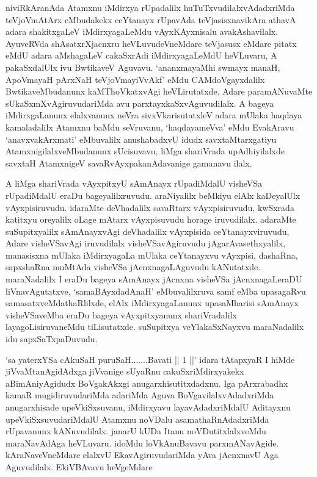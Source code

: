 \begin{artha}
niviRkAranAda Atamxnu iMdirxya rUpadalilx huTuTxvudilalxvAdadxriMda teVjoVmAtArx eMbudakekx ceYtanayx rUpavAda teVjasisxnavikAra athavA adara shakitxgaLeV iMdirxyagaLeMdu vAyxKAyxnisalu avakAshavilalx. AyuveRVda shAsatxrXjacnxru heVLuvudeVneMdare teVjasusx eMdare pitatx eMdU adara aMshagaLeV cakaSxrAdi iMdirxyagaLeMdU heVLuvaru, A pakaSxdalUlx ivu BwtikaveV Aguvavu. `ananxmayaMhi swmayx manaH, ApoVmayaH pArxNaH teVjoVmayiVvAkf' eMdu CAMdoVgayxdalilx BwtikaveMbudanunx kaMThoVkatxvAgi heVLirutatxde. Adare paramANuvaMte sUkaSxmXvAgiruvudariMda avu parxtayxkaSxvAguvudilalx. A bageya iMdirxgaLanunx elalxvanunx neVra sivxVkarisutatxleV adara mUlaka haqdaya kamaladalilx Atamxnu baMdu seVruvanu, `haqdayameVva' eMdu EvakAravu `anavxvakArxmati' eMbuvalilx anushabadxvU idudx savxtaMtarxgatiyu AtamxnigilalxveMbudanunx sUcisuvavu, liMga shariVrada upAdhiyilalxde savxtaH AtamxnigeV savaRvAyxpakanAdavanige gamanavu ilalx. 
\end{artha}

\begin{artha}
A liMga shariVrada vAyxpitxyU sAmAnayx rUpadiMdalU visheVSa rUpadiMdalU eraDu bageyalilxruvudu. araNiyalilx beMkiyu elAlx kaDeyalUlx vAyxpisiruvudu. idaraMte deVhadalilx savaRtarx vAyxpisiruvudu, kwSxrada katitxyu oreyalilx oLage mAtarx vAyxpisuvudu horage iruvudilalx. adaraMte suSupitxyalilx sAmAnayxvAgi deVhadalilx vAyxpisida ceYtanayxviruvudu, Adare visheVSavAgi iruvudilalx visheVSavAgiruvudu jAgarAvasethxyalilx, manasisxna mUlaka iMdirxyagaLa mUlaka ceYtanayxvu vAyxpisi, dashaRna, sapxshaRna muMtAda visheVSa jAcnxnagaLAguvudu kANutatxde. maraNadalilx I eraDu bageya sAmAnayx jAcnxna visheVSa jAcnxnagaLeraDU liVnavAgutatxve, `samaBAyxdadAnaH' eMbuvalilxruva samf eMba upasagaRvu samasatxveMdathaRlilxde, elAlx iMdirxyagaLanunx upasaMharisi sAmAnayx visheVSaveMba eraDu bageya vAyxpitxyanunx shariVradalilx layagoLisiruvaneMdu tiLisutatxde. suSupitxya veYlakaSxNayxvu maraNadalilx idu sapxSaTxpaDuvudu. 
\end{artha}

\begin{artha}%
`sa yaterxYSa cAkuSaH puruSaH.......Bavati || 1 ||' idara tAtapxyaR I hiMde jiVvaMtanAgidAdxga jiVvanige sUyaRnu cakuSxriMdirxyakekx aBimAniyAgidudx BoVgakAkxgi anugarxhisutitxdadxnu. Iga pArxrabadhx kamaR mugidiruvudariMda adariMda Aguva BoVgavilalxvAdadxriMda anugarxhisade upeVkiSxsuvanu, iMdirxyavu layavAdadxriMdalU Aditayxnu upeVkiSxsuvudariMdalU Atamxnu noVDalu asamathaRnAdadxriMda rUpavanunx kANuvudilalx. janarU kUDa Itanu noVDutitxlalxveMdu maraNavAdAga heVLuvaru. idoMdu loVkAnuBavavu parxmANavAgide. kAraNaveVneMdare elalxvU EkavAgiruvudariMda yAva jAcnxnavU Aga Aguvudilalx. EkiVBAvavu heVgeMdare
\end{artha}

